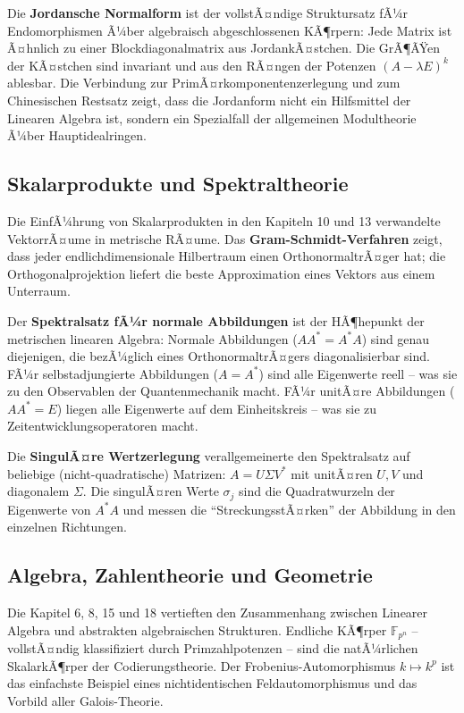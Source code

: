 ﻿\documentclass[a4paper,12pt]{report}
\theoremstyle{definition}
\begin{document}
Die \textbf{Jordansche Normalform} ist der vollstÃ¤ndige
Struktursatz fÃ¼r Endomorphismen Ã¼ber algebraisch abgeschlossenen
KÃ¶rpern: Jede Matrix ist Ã¤hnlich zu einer Blockdiagonalmatrix
aus JordankÃ¤stchen. Die GrÃ¶ÃŸen der KÃ¤stchen sind invariant und
aus den RÃ¤ngen der Potenzen $(A - \lambda E)^k$ ablesbar.
Die Verbindung zur PrimÃ¤rkomponentenzerlegung und zum Chinesischen
Restsatz zeigt, dass die Jordanform nicht ein Hilfsmittel der
Linearen Algebra ist, sondern ein Spezialfall der
allgemeinen Modultheorie Ã¼ber Hauptidealringen.

\subsection*{Skalarprodukte und Spektraltheorie}

Die EinfÃ¼hrung von Skalarprodukten in den Kapiteln 10 und 13
verwandelte VektorrÃ¤ume in metrische RÃ¤ume. Das
\textbf{Gram-Schmidt-Verfahren} zeigt, dass jeder
endlichdimensionale Hilbertraum einen OrthonormaltrÃ¤ger hat;
die Orthogonalprojektion liefert die beste Approximation
eines Vektors aus einem Unterraum.

Der \textbf{Spektralsatz fÃ¼r normale Abbildungen} ist der
HÃ¶hepunkt der metrischen linearen Algebra: Normale Abbildungen
($AA^* = A^*A$) sind genau diejenigen, die bezÃ¼glich eines
OrthonormaltrÃ¤gers diagonalisierbar sind. FÃ¼r selbstadjungierte
Abbildungen ($A = A^*$) sind alle Eigenwerte reell -- was sie
zu den Observablen der Quantenmechanik macht. FÃ¼r unitÃ¤re
Abbildungen ($AA^* = E$) liegen alle Eigenwerte auf dem
Einheitskreis -- was sie zu Zeitentwicklungsoperatoren macht.

Die \textbf{SingulÃ¤re Wertzerlegung} verallgemeinerte den
Spektralsatz auf beliebige (nicht-quadratische) Matrizen:
$A = U\Sigma V^*$ mit unitÃ¤ren $U, V$ und diagonalem $\Sigma$.
Die singulÃ¤ren Werte $\sigma_j$ sind die Quadratwurzeln der
Eigenwerte von $A^*A$ und messen die ``StreckungsstÃ¤rken'' der
Abbildung in den einzelnen Richtungen.

\subsection*{Algebra, Zahlentheorie und Geometrie}

Die Kapitel 6, 8, 15 und 18 vertieften den Zusammenhang zwischen
Linearer Algebra und abstrakten algebraischen Strukturen.
Endliche KÃ¶rper $\mathbb{F}_{p^n}$ -- vollstÃ¤ndig klassifiziert
durch Primzahlpotenzen -- sind die natÃ¼rlichen SkalarkÃ¶rper
der Codierungstheorie. Der Frobenius-Automorphismus $k \mapsto k^p$
ist das einfachste Beispiel eines nichtidentischen Feldautomorphismus
und das Vorbild aller Galois-Theorie.
\end{document}
